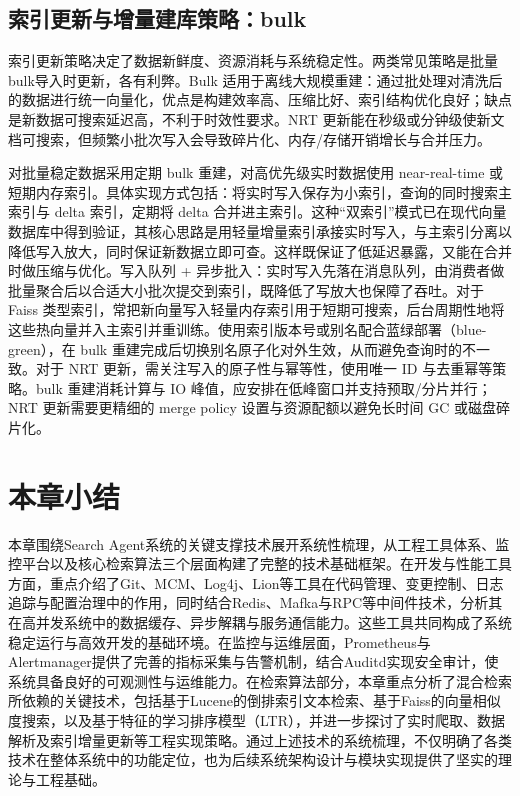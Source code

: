 \subsection{索引更新与增量建库策略：bulk }
索引更新策略决定了数据新鲜度、资源消耗与系统稳定性。两类常见策略是批量bulk导入时更新，各有利弊。Bulk 适用于离线大规模重建：通过批处理对清洗后的数据进行统一向量化，优点是构建效率高、压缩比好、索引结构优化良好；缺点是新数据可搜索延迟高，不利于时效性要求。NRT 更新能在秒级或分钟级使新文档可搜索，但频繁小批次写入会导致碎片化、内存/存储开销增长与合并压力。

对批量稳定数据采用定期 bulk 重建，对高优先级实时数据使用 near-real-time 或短期内存索引。具体实现方式包括：将实时写入保存为小索引，查询的同时搜索主索引与 delta 索引，定期将 delta 合并进主索引。这种“双索引”模式已在现代向量数据库中得到验证，其核心思路是用轻量增量索引承接实时写入，与主索引分离以降低写入放大，同时保证新数据立即可查\cite{xu2025streaming}。这样既保证了低延迟暴露，又能在合并时做压缩与优化。写入队列 + 异步批入：实时写入先落在消息队列，由消费者做批量聚合后以合适大小批次提交到索引，既降低了写放大也保障了吞吐。对于 Faiss 类型索引，常把新向量写入轻量内存索引用于短期可搜索，后台周期性地将这些热向量并入主索引并重训练\cite{ji2026updatable}。使用索引版本号或别名配合蓝绿部署（blue-green），在 bulk 重建完成后切换别名原子化对外生效，从而避免查询时的不一致。对于 NRT 更新，需关注写入的原子性与幂等性，使用唯一 ID 与去重幂等策略。bulk 重建消耗计算与 IO 峰值，应安排在低峰窗口并支持预取/分片并行；NRT 更新需要更精细的 merge policy 设置与资源配额以避免长时间 GC 或磁盘碎片化\cite{mohoney2025quake}。

\section{本章小结}
本章围绕Search Agent系统的关键支撑技术展开系统性梳理，从工程工具体系、监控平台以及核心检索算法三个层面构建了完整的技术基础框架。在开发与性能工具方面，重点介绍了Git、MCM、Log4j、Lion等工具在代码管理、变更控制、日志追踪与配置治理中的作用，同时结合Redis、Mafka与RPC等中间件技术，分析其在高并发系统中的数据缓存、异步解耦与服务通信能力。这些工具共同构成了系统稳定运行与高效开发的基础环境。在监控与运维层面，Prometheus与Alertmanager提供了完善的指标采集与告警机制，结合Auditd实现安全审计，使系统具备良好的可观测性与运维能力。在检索算法部分，本章重点分析了混合检索所依赖的关键技术，包括基于Lucene的倒排索引文本检索、基于Faiss的向量相似度搜索，以及基于特征的学习排序模型（LTR），并进一步探讨了实时爬取、数据解析及索引增量更新等工程实现策略。通过上述技术的系统梳理，不仅明确了各类技术在整体系统中的功能定位，也为后续系统架构设计与模块实现提供了坚实的理论与工程基础。